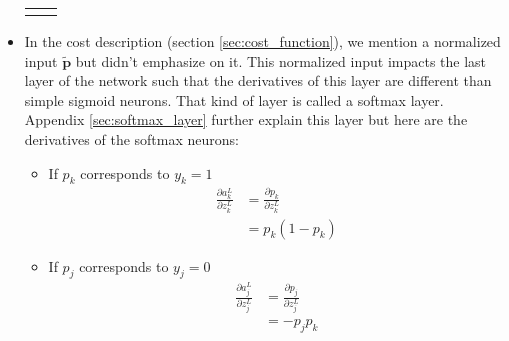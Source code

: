 \begin{itemize}
\begin{tabular}{c|c}
{\begin{equation}
							\end{equation}
						}
					\end{tabular}
				\item In the cost description (section \ref{sec:cost_function}), we mention a normalized input $\widetilde{\boldsymbol{p}}$ but didn't emphasize on it. This normalized input impacts the last layer of the network such that the derivatives of this layer are different than simple sigmoid neurons. That kind of layer is called a softmax layer. Appendix \ref{sec:softmax_layer} further explain this layer but here are the derivatives of the softmax neurons:
				\begin{itemize}
					\item If $p_k$ corresponds to $y_k=1$
						\begin{equation}
							\label{eq:softmax_deriv_1}
							\begin{split}
								\frac{\partial a^L_k}{\partial z^L_k}
								&= \frac{\partial p_k}{\partial z^L_k} \\
								&= p_k (1-p_k)
							\end{split}
						\end{equation}
					\item If $p_j$ corresponds to $y_j=0$
						\begin{equation}
							\label{eq:softmax_deriv_2}
							\begin{split}
								\frac{\partial a^L_j}{\partial z^L_j}
								&= \frac{\partial p_j}{\partial z^L_j}\\
								&= -p_j p_k
							\end{split}
						\end{equation}
				\end{itemize}
			\end{itemize}

